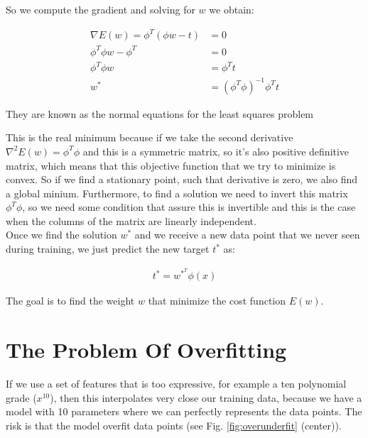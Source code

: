 \noindent So we compute the gradient and solving for $w$ we obtain:
\begin{Equation}[H]
	\centering
	\begin{equation} \label{eq:normeq}
		\begin{aligned}
			\nabla E(w) = \phi^T(\phi w - t) &= 0 \\
			\phi^T \phi w - \phi^T &= 0 \\
			\phi^T \phi w &= \phi^T t \\
			w^* &= (\phi^T \phi)^{-1} \phi^T t
		\end{aligned}
	\end{equation}
	\caption[Normal equations.]{They are known as the normal equations for the least squares problem}
\end{Equation}

\noindent This is the real minimum because if we take the second derivative $ \nabla^2 E(w) = \phi^T \phi $ and this is a symmetric matrix, so it's also positive definitive matrix, which means that this objective function that we try to minimize is convex. So if we find a stationary point, such that derivative is zero, we also find a global minium. Furthermore, to find a solution we need to invert this matrix $ \phi^T \phi $, so we need some condition that assure this is invertible and this is the case when the columns of the matrix are linearly independent. \\

\noindent Once we find the solution $w^*$ and we receive a new data point that we never seen during training, we just predict the new target $t^*$ as:

\begin{Equation}[H]
	\centering
	\begin{equation} \label{eq:soloptridgereg}
		\begin{aligned}
			t^* = w^{*^T} \phi(x)
		\end{aligned}
	\end{equation}
	\caption[Prediction in ridge regression.]{The goal is to find the weight $w$ that minimize the cost function $E(w)$.}
\end{Equation}

\section{The Problem Of Overfitting}
\label{subsec:poverfitting}
If we use a set of features that is too expressive, for example a ten polynomial grade ($x^{10}$), then this interpolates very close our training data, because we have a model with 10 parameters where we can perfectly represents the data points. The risk is that the model overfit data points (see Fig. \ref{fig:overunderfit} (center)).

